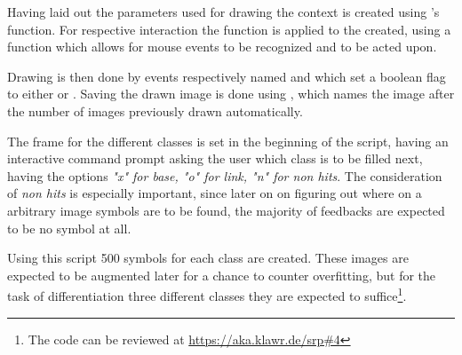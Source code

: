 Having laid out the parameters used for drawing the context is created using 's  function.
For respective interaction the  function is applied to the  created, using a  function which allows for mouse events to be recognized and to be acted upon.

Drawing is then done by events respectively named  and  which set a boolean  flag to either  or .
Saving the drawn image is done using , which names the image after the number of images previously drawn automatically.

The frame for the different classes is set in the beginning of the script, having an interactive command prompt asking the user which class is to be filled next, having the options \textit{"x" for base, "o" for link, "n" for non hits}.
The consideration of \textit{non hits} is especially important, since later on on figuring out where on a arbitrary image symbols are to be found, the majority of feedbacks are expected to be no symbol at all.

Using this script 500 symbols for each class are created.
These images are expected to be augmented later for a chance to counter overfitting, but for the task of differentiation three different classes they are expected to suffice\footnote{The code can be reviewed at \url{https://aka.klawr.de/srp\#4}}.

